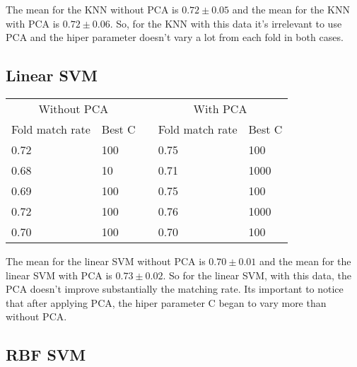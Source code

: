 \documentclass{article}
\begin{document}
The mean for the KNN without PCA is $0.72 \pm 0.05$ and the mean for the KNN with PCA is $0.72 \pm 0.06$. So, for the KNN with this data it's irrelevant to use PCA and the hiper parameter doesn't vary a lot from each fold in both cases.

\subsection{Linear SVM}

\begin{table}[h]
    \begin{tabular}{|l|l|l|l|l|}
    \cline{1-2} \cline{4-5}
    \multicolumn{2}{|c|}{Without PCA} &  & \multicolumn{2}{|c|}{With PCA} \\ \cline{1-2} \cline{4-5}
    Fold match rate & Best C &  & Fold match rate & Best C  \\ \cline{1-2} \cline{4-5}
    0.72 & 100 &  & 0.75 & 100  \\ \cline{1-2} \cline{4-5}
    0.68 & 10  &  & 0.71 & 1000  \\ \cline{1-2} \cline{4-5}
    0.69 & 100 &  & 0.75 & 100  \\ \cline{1-2} \cline{4-5}
    0.72 & 100 &  & 0.76 & 1000  \\ \cline{1-2} \cline{4-5}
    0.70 & 100 &  & 0.70 & 100  \\ \cline{1-2} \cline{4-5}
    \end{tabular}
\end{table}

The mean for the linear SVM without PCA is $0.70 \pm 0.01$ and the mean for the linear SVM with PCA is $0.73 \pm 0.02$. So for the linear SVM, with this data, the PCA doesn't improve substantially the matching rate.
Its important to notice that after applying PCA, the hiper parameter C
began to vary more than without PCA.

\newpage

\subsection{RBF SVM}
\end{document}
